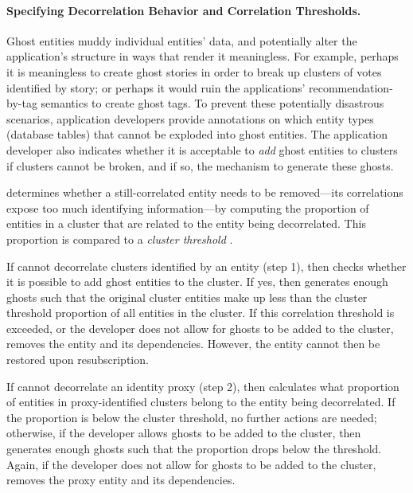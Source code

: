 \paragraph{Specifying Decorrelation Behavior and Correlation Thresholds.}
Ghost entities muddy individual entities' data, and potentially alter the application's structure in
ways that render it meaningless. 
For example, perhaps it is meaningless to create ghost stories in order to break up clusters of
votes identified by story; or perhaps it would ruin the applications' recommendation-by-tag
semantics to create ghost tags.   To prevent these potentially disastrous scenarios, application developers
provide annotations on which entity types (database tables) that cannot be exploded into ghost
entities.  The application developer also indicates whether it is acceptable
to \emph{add} ghost entities to clusters if clusters cannot be broken, and if so, the mechanism to
generate these ghosts. 

\sys{} determines whether a still-correlated entity needs to be removed---its correlations expose
too much identifying information---by computing the proportion of entities in a cluster that are
related to the entity being decorrelated. This proportion is compared to a \emph{cluster threshold}
.

If \sys{} cannot decorrelate clusters identified by an entity (step 1), then \sys{} checks whether
it is possible to add ghost entities to the cluster. If yes, then \sys{} generates enough ghosts
such that the original cluster entities make up less than the cluster threshold proportion of
all entities in the cluster.  If this correlation threshold is exceeded, or the developer does not
allow for ghosts to be added to the cluster, \sys{} removes the entity and its dependencies.
However, the entity cannot then be restored upon resubscription.

If \sys{} cannot decorrelate an identity proxy (step 2), then \sys{} calculates what proportion of entities 
in proxy-identified clusters belong to the entity being decorrelated. If the proportion is below the
cluster threshold, no further actions are needed; otherwise, if the developer allows ghosts to be
added to the cluster, then \sys{} generates enough ghosts such that the proportion drops below the
threshold. Again, if the developer does not allow for ghosts to be added to the cluster, \sys{}
removes the proxy entity and its dependencies.

